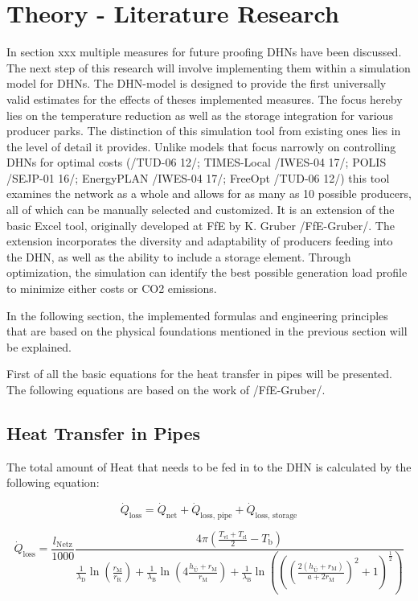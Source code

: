 
\chapter{Theory - Literature Research}

In section xxx multiple measures for future proofing DHNs have been discussed. The next step of this research will involve implementing them within a simulation model for DHNs.
The DHN-model is designed to provide the first universally valid estimates for the effects of theses implemented measures. The focus hereby lies on the temperature reduction as well as the storage integration for various producer parks. The distinction of this simulation tool from existing ones lies in the level of detail it provides. Unlike models that focus narrowly on controlling DHNs for optimal costs (/TUD-06 12/; TIMES-Local /IWES-04 17/; POLIS /SEJP-01 16/; EnergyPLAN /IWES-04 17/; FreeOpt /TUD-06 12/) this tool examines the network as a whole and allows for as many as 10 possible producers, all of which can be manually selected and customized. It is an extension of the basic Excel tool, originally developed at FfE by K. Gruber /FfE-Gruber/. The extension incorporates the diversity and adaptability of producers feeding into the DHN, as well as the ability to include a storage element. Through optimization, the simulation can identify the best possible generation load profile to minimize either costs or CO2 emissions. 

In the following section, the implemented formulas and engineering principles that are based on the physical foundations mentioned in the previous section will be explained. 

First of all the basic equations for the heat transfer in pipes will be presented. The following equations are based on the work of /FfE-Gruber/.

\section{Heat Transfer in Pipes}

The total amount of Heat that needs to be fed in to the DHN is calculated by the following equation:

\begin{equation}
\dot{Q}_{\text{loss}} = \dot{Q}_{\text{net}} + \dot{Q}_{\text{loss, pipe}} + \dot{Q}_{\text{loss, storage}}
\end{equation}









\[
\dot{Q}_{\text{loss}} = \frac{l_{\text{Netz}}}{1000} \frac{4 \pi \left(\frac{T_{\text{vl}} + T_{\text{rl}}}{2} - T_{\text{b}}\right)}{\frac{1}{\lambda_{\text{D}}} \ln\left(\frac{r_{\text{M}}}{r_{\text{R}}}\right) + \frac{1}{\lambda_{\text{B}}} \ln\left(4 \frac{h_{\text{Ü}} + r_{\text{M}}}{r_{\text{M}}}\right) + \frac{1}{\lambda_{\text{B}}} \ln\left(\left(\left(\frac{2(h_{\text{Ü}} + r_{\text{M}})}{a+ 2 r_{\text{M}}} \right)^2 + 1\right)^{\frac{1}{2}}\right)}
\]

